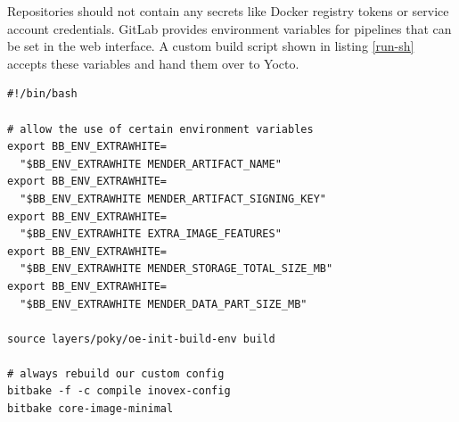 Repositories should not contain any secrets like Docker registry tokens or service account credentials. GitLab provides environment variables for pipelines that can be set in the web interface. A custom build script shown in listing \ref{run-sh} accepts these variables and hand them over to Yocto.
\begin{code}
  \label{run-sh}
  \begin{verbatim}
#!/bin/bash

# allow the use of certain environment variables
export BB_ENV_EXTRAWHITE=
  "$BB_ENV_EXTRAWHITE MENDER_ARTIFACT_NAME"
export BB_ENV_EXTRAWHITE=
  "$BB_ENV_EXTRAWHITE MENDER_ARTIFACT_SIGNING_KEY"
export BB_ENV_EXTRAWHITE=
  "$BB_ENV_EXTRAWHITE EXTRA_IMAGE_FEATURES"
export BB_ENV_EXTRAWHITE=
  "$BB_ENV_EXTRAWHITE MENDER_STORAGE_TOTAL_SIZE_MB"
export BB_ENV_EXTRAWHITE=
  "$BB_ENV_EXTRAWHITE MENDER_DATA_PART_SIZE_MB"

source layers/poky/oe-init-build-env build

# always rebuild our custom config
bitbake -f -c compile inovex-config
bitbake core-image-minimal
  \end{verbatim}
\end{code}
\newpage

